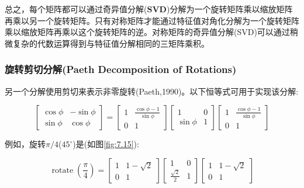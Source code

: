 总之，每个矩阵都可以通过奇异值分解($\mathbf{SVD}$)分解为一个旋转矩阵乘以缩放矩阵再乘以另一个旋转矩阵。只有对称矩阵才能通过特征值对角化分解为一个旋转矩阵乘以缩放矩阵再乘以这个旋转矩阵的逆。对称矩阵的奇异值分解(SVD)可以通过稍微复杂的代数运算得到与特征值分解相同的三矩阵乘积。

\subsubsection*{\textcolor{structure3}{旋转剪切分解(Paeth Decomposition of Rotations)}}

另一个分解使用剪切来表示非零旋转(Paeth,1990)。以下恒等式可用于实现该分解:

\begin{equation}
	\left[\begin{array}{cr}
		\cos \phi & -\sin \phi \\
		\sin \phi & \cos \phi
	\end{array}\right]=\left[\begin{array}{cc}
		1 & \frac{\cos \phi-1}{\sin \phi} \\
		0 & 1
	\end{array}\right]\left[\begin{array}{cc}
		1 & 0 \\
		\sin \phi & 1
	\end{array}\right]\left[\begin{array}{cc}
		1 & \frac{\cos \phi-1}{\sin \phi} \\
		0 & 1
	\end{array}\right]
\nonumber
\end{equation}

例如，旋转$\pi / 4$($45^{\circ}$)是(如图\ref{fig:7.15}):

\begin{equation}
	\operatorname{rotate}\left(\frac{\pi}{4}\right)=\left[\begin{array}{cc}
		1 & 1-\sqrt{2} \\
		0 & 1
	\end{array}\right]\left[\begin{array}{cc}
		1 & 0 \\
		\frac{\sqrt{2}}{2} & 1
	\end{array}\right]\left[\begin{array}{cc}
		1 & 1-\sqrt{2} \\
		0 & 1
	\end{array}\right]
\label{con:7.2}
\end{equation}

